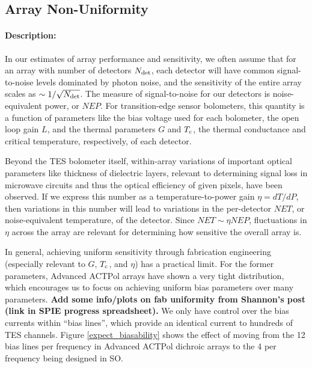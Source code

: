 \subsection{Array Non-Uniformity}

\paragraph{Description:}
In our estimates of array performance and sensitivity, we often assume that for an array with number of detectors $N_{\mbox{\scriptsize det}}$, each detector will have common signal-to-noise levels dominated by photon noise, and the sensitivity of the entire array scales as $\sim 1 / \sqrt{N_{\mbox{\scriptsize det}}}$. The measure of signal-to-noise for our detectors is noise-equivalent power, or $NEP$. For transition-edge sensor bolometers, this quantity is a function of parameters like the bias voltage used for each bolometer, the open loop gain $L$, and the thermal parameters $G$ and $T_{\mbox{\scriptsize c}}$, the thermal conductance and critical temperature, respectively, of each detector.

Beyond the TES bolometer itself, within-array variations of important optical parameters like thickness of dielectric layers, relevant to determining signal loss in microwave circuits and thus the optical efficiency of given pixels, have been observed. If we express this number as a temperature-to-power gain $\eta = dT/dP$, then variations in this number will lead to variations in the per-detector $NET$, or noise-equivalent temperature, of the detector. Since $NET \sim \eta NEP$, fluctuations in $\eta$ across the array are relevant for determining how sensitive the overall array is.

In general, achieving uniform sensitivity through fabrication engineering (especially relevant to $G$, $T_{\mbox{\scriptsize c}}$, and $\eta$) has a practical limit. For the former parameters, Advanced ACTPol arrays have shown a very tight distribution, which encourages us to focus on achieving uniform bias parameters over many parameters. \textbf{Add some info/plots on fab uniformity from Shannon's post (link in SPIE progress spreadsheet).} We only have control over the bias currents within ``bias lines'', which provide an identical current to hundreds of TES channels. Figure \ref{expect_biasability} shows the effect of moving from the 12 bias lines per frequency in Advanced ACTPol dichroic arrays to the 4 per frequency being designed in SO.


